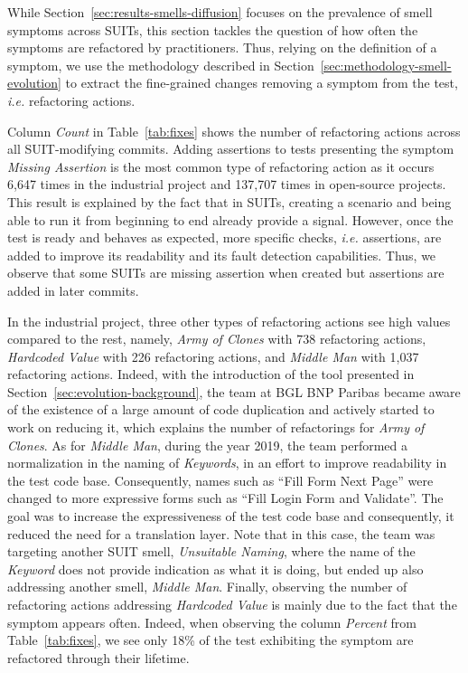 While Section~\ref{sec:results-smells-diffusion} focuses on the prevalence of smell symptoms across SUITs, this section tackles the question of how often the symptoms are refactored by practitioners. Thus, relying on the definition of a symptom, we use the methodology described in Section~\ref{sec:methodology-smell-evolution} to extract the fine-grained changes removing a symptom from the test, \emph{i.e.} refactoring actions.

Column \emph{Count} in Table~\ref{tab:fixes} shows the number of refactoring actions across all SUIT-modifying commits. Adding assertions to tests presenting the symptom \emph{Missing Assertion} is the most common type of refactoring action as it occurs 6,647 times in the industrial project and 137,707 times in open-source projects. This result is explained by the fact that in SUITs, creating a scenario and being able to run it from beginning to end already provide a signal. However, once the test is ready and behaves as expected, more specific checks, \emph{i.e.} assertions, are added to improve its readability and its fault detection capabilities. Thus, we observe that some SUITs are missing assertion when created but assertions are added in later commits. 

In the industrial project, three other types of refactoring actions see high values compared to the rest, namely, \emph{Army of Clones} with 738 refactoring actions, \emph{Hardcoded Value} with 226 refactoring actions, and \emph{Middle Man} with 1,037 refactoring actions. Indeed, with the introduction of the tool presented in Section~\ref{sec:evolution-background}, the team at BGL BNP Paribas became aware of the existence of a large amount of code duplication and actively started to work on reducing it, which explains the number of refactorings for \emph{Army of Clones}. As for \emph{Middle Man}, during the year 2019, the team performed a normalization in the naming of \emph{Keywords}, in an effort to improve readability in the test code base. Consequently, names such as ``Fill Form Next Page'' were changed to more expressive forms such as ``Fill Login Form and Validate''. The goal was to increase the expressiveness of the test code base and consequently, it reduced the need for a translation layer. Note that in this case, the team was targeting another SUIT smell, \emph{Unsuitable Naming}, where the name of the \emph{Keyword} does not provide indication as what it is doing, but ended up also addressing another smell, \emph{Middle Man}. Finally, observing the number of refactoring actions addressing \emph{Hardcoded Value} is mainly due to the fact that the symptom appears often. Indeed, when observing the column \emph{Percent} from Table~\ref{tab:fixes}, we see only 18\% of the test exhibiting the symptom are refactored through their lifetime. 

